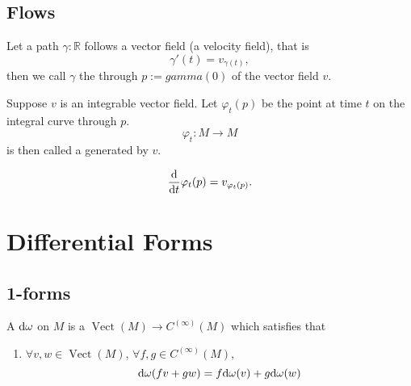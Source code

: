 \documentclass[openany, oneside, a5paper]{book}
\DeclareMathOperator{\Vect}{Vect}
\begin{document}
\section{Flows}

Let a path $\gamma \colon \mathbb R$ follows a vector field (a velocity field), that is
\begin{equation}
    \gamma'(t) = v_{\gamma(t)},
\end{equation}
then we call $\gamma$ the  through $p := gamma(0)$ of the vector field $v$.

\begin{definition}
    Suppose $v$ is an integrable vector field.
    Let $\varphi_t(p)$ be the point at time $t$ on the integral curve through $p$.
    \begin{equation}
        \varphi_t \colon M \to M
    \end{equation}
    is then called a  generated by $v$.
\end{definition}

\begin{equation}
    \diff{}{t}\varphi_t(p) = v_{\varphi_t(p)}.
\end{equation}

\chapter{Differential Forms}

\section{1-forms}

\begin{definition}[1-form]
    A  $\mathrm{d} \omega$ on $M$ is a $\Vect(M) \to C^{(\infty)}(M)$ which satisfies that
    \begin{enumerate}[label=(\alph*)]
        \item $\forall v, w \in \Vect(M)$, $\forall f, g \in C^{(\infty)}(M)$, 
        \begin{equation}
            \mathrm{d} \omega (fv + gw) = f \mathrm{d} \omega (v) + g \mathrm{d} \omega (w)
        \end{equation}
    \end{enumerate}
\end{definition}

\backmatter{}
\nocite{*} %
\printbibliography[heading=bibliography, title={bibliography}]

\printindex[symbol]

\printindex
\end{document}
